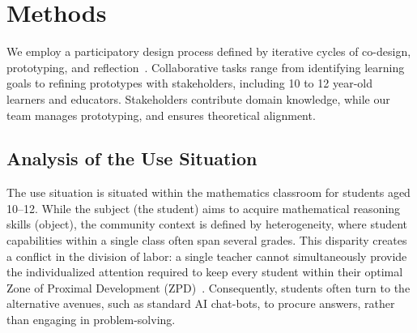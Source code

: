 \section{Methods}


We employ a participatory design process defined by iterative cycles of co-design, prototyping, and reflection~\cite{sanders2008evolving}. Collaborative tasks range from identifying learning goals to refining prototypes with stakeholders, including 10 to 12 year-old learners and educators. Stakeholders contribute domain knowledge, while our team manages prototyping, and ensures theoretical alignment.

\subsection{Analysis of the Use Situation}


The use situation is situated within the mathematics classroom for students aged 10--12. While the subject (the student) aims to acquire mathematical reasoning skills (object), the community context is defined by heterogeneity, where student capabilities within a single class often span several grades. This disparity creates a conflict in the division of labor: a single teacher cannot simultaneously provide the individualized attention required to keep every student within their optimal Zone of Proximal Development (ZPD)~\cite{vygotsky1978mind}. Consequently, students often turn to the alternative avenues, such as standard AI chat-bots, to procure answers, rather than engaging in problem-solving.

